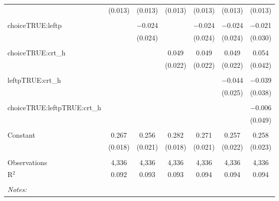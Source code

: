\begin{table}[!htbp]
\begin{tabular}{@{\extracolsep{5pt}}lcccccc}
  & (0.013) & (0.013) & (0.013) & (0.013) & (0.013) & (0.013) \\ 
  & & & & & & \\ 
 choiceTRUE:leftp &  & $-$0.024 &  & $-$0.024 & $-$0.024 & $-$0.021 \\ 
  &  & (0.024) &  & (0.024) & (0.024) & (0.030) \\ 
  & & & & & & \\ 
 choiceTRUE:crt\_h &  &  & 0.049 & 0.049 & 0.049 & 0.054 \\ 
  &  &  & (0.022) & (0.022) & (0.022) & (0.042) \\ 
  & & & & & & \\ 
 leftpTRUE:crt\_h &  &  &  &  & $-$0.044 & $-$0.039 \\ 
  &  &  &  &  & (0.025) & (0.038) \\ 
  & & & & & & \\ 
 choiceTRUE:leftpTRUE:crt\_h &  &  &  &  &  & $-$0.006 \\ 
  &  &  &  &  &  & (0.049) \\ 
  & & & & & & \\ 
 Constant & 0.267 & 0.256 & 0.282 & 0.271 & 0.257 & 0.258 \\ 
  & (0.018) & (0.021) & (0.018) & (0.021) & (0.022) & (0.023) \\ 
  & & & & & & \\ 
Observations & 4,336 & 4,336 & 4,336 & 4,336 & 4,336 & 4,336 \\ 
R$^{2}$ & 0.092 & 0.093 & 0.093 & 0.094 & 0.094 & 0.094 \\ 
\hline \\[-1.8ex] 
\textit{Notes:} & \multicolumn{6}{l}{} \\ 
\end{tabular} 
\end{table} 
